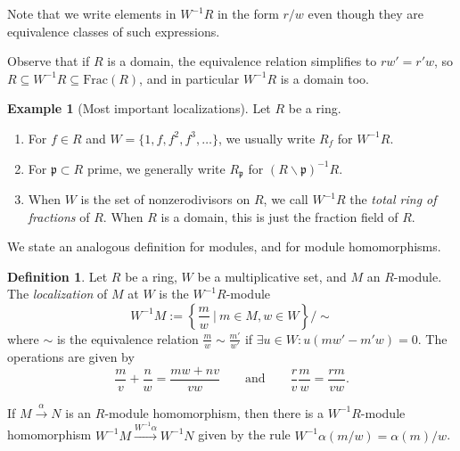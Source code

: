\documentclass{amsart}[12pt]
\newcommand{\p}{{\mathfrak p}}
\numberwithin{equation}{section}
\theoremstyle{plain} %
\newtheorem{proposition}[equation]{Proposition}
\theoremstyle{definition}
\newtheorem{definition}[equation]{Definition}
\newtheorem{example}[equation]{Example}
\theoremstyle{remark}
\begin{document}
Note that we write elements in $W^{-1}R$ in the form $r/w$ even though they are equivalence classes of such expressions.

Observe that if $R$ is a domain, the equivalence relation simplifies to $rw'=r'w$, so $R \subseteq W^{-1}R \subseteq \mathrm{Frac}(R)$, and in particular $ W^{-1}R$ is a domain too.



\begin{example}[Most important localizations] Let $R$ be a ring.
	\begin{enumerate}
		\item For $f\in R$ and $W=\{1, f, f^2, f^3, \dots\}$, we usually write $R_f$ for $W^{-1}R$.
		\item For $\p\subset R$ prime, we generally write $R_{\p}$\index{$R_{\p}$} for $(R\smallsetminus \p)^{-1} R$.
		\item When $W$ is the set of nonzerodivisors on $R$, we call $W^{-1}R$ the \emph{total ring of fractions} of $R$. When $R$ is a domain, this is just the fraction field of $R$.
	\end{enumerate}
\end{example}

We state an analogous definition for modules, and for module homomorphisms.

\begin{definition}
	Let $R$ be a ring, $W$ be a multiplicative set, and $M$ an $R$-module. The \emph{localization} of $M$ at $W$ is the $W^{-1}R$-module
	\[ W^{-1} M := \left\{ \frac{m} {w} \ \Big| \ m\in M, w\in W \right\} / \sim \]
	where $\sim$ is the equivalence relation $\displaystyle \frac{m}{w}\sim \frac{m'}{w'}$ if $\exists u\in W : u(mw'-m'w)=0$. The operations are given by \[\frac{m}{v}+\frac{n}{w}=\frac{mw+nv}{vw} \qquad \text{and} \qquad \frac{r}{v} \frac{m}{w}=\frac{rm}{vw}.\]
	
	If $M\xrightarrow{\alpha} N$ is an $R$-module homomorphism, then there is a $W^{-1}R$-module homomorphism $W^{-1}M \xrightarrow{W^{-1}\alpha} W^{-1}N$ given by the rule $W^{-1}\alpha (m/w) = \alpha(m)/w$.
\end{definition}
\end{document}
